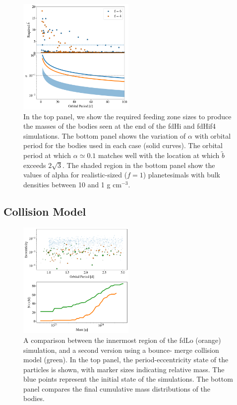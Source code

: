\documentclass[twocolumn,linenumbers]{aastex63}
\begin{document}
\begin{figure}
\begin{center}
    \includegraphics[width=0.5\textwidth]{figures/f6f4_b.png}
    \caption{In the top panel, we show the required feeding zone sizes to produce the masses of the bodies seen
    at the end of the fdHi and fdHif4 simulations.  The bottom panel shows the variation of $\alpha$ with orbital period for the 
    bodies used in each case (solid curves). The orbital period at which $\alpha \simeq 0.1$ matches well with the location at 
    which $\tilde{b}$ exceeds $2 \sqrt{3}$. The shaded region
    in the bottom panel show the values of alpha for realistic-sized ($f=1$) planetesimals with bulk densities between 10 and 1 g cm$^{-3}$.\label{fig:f6f4_b}}
\end{center}
\end{figure}

\subsection{Collision Model}

\begin{figure}
\begin{center}
    \includegraphics[width=0.5\textwidth]{figures/frag_ecc.png}
    \caption{A comparison between the innermost region of the fdLo (orange) simulation, and a second version using a bounce-
    merge collision model (green). In the top panel, the period-eccentricity state of the particles is shown, with marker sizes 
    indicating relative mass. The blue points represent the initial state of the simulations. The bottom panel compares the final 
    cumulative mass distributions of the bodies. \label{fig:frag_ecc}}
\end{center}
\end{figure}
\end{document}

